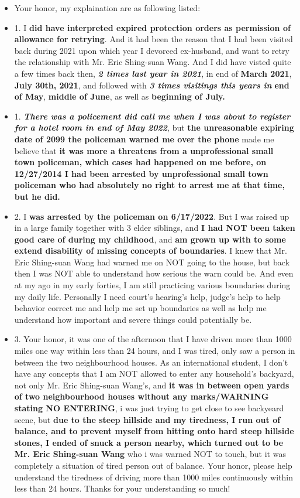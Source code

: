 \documentclass[9pt, b5paper]{article}
\begin{document}
\begin{itemize}
\item Your honor, my explaination are as following listed:
\item 1. I \textbf{did have interpreted expired protection orders as permission of allowance for retrying}. And it had been the reason that I had been visited back during 2021 upon which year I devorced ex-husband, and want to retry the relationship with Mr. Eric Shing-suan Wang. And I did have visted quite a few times back then, \emph{\textbf{2 times last year in 2021}}, in end of \textbf{March 2021}, \textbf{July 30th, 2021}, and followed with \emph{\textbf{3 times visitings this years in}} \textbf{end of May}, \textbf{middle of June}, as well as \textbf{beginning of July.}
\item 1. \emph{\textbf{There was a policement did call me when I was about to register for a hotel room in end of May 2022}}, but \textbf{the unreasonable expiring date of 2099 the policeman warned me over the phone} made me believe that \textbf{it was more a threatens from a unprofessional small town policeman, which cases had happened on me before, on 12/27/2014 I had been arrested by unprofessional small town policeman who had absolutely no right to arrest me at that time, but he did.}
\item 2. I \textbf{was arrested by the policeman on 6/17/2022}. But I was raised up in a large family together with 3 elder siblings, and \textbf{I had NOT been taken good care of during my childhood}, and \textbf{am grown up with to some extend disability of missing concepts of boundaries}. I knew that Mr. Eric Shing-suan Wang had warned me on NOT going to the house, but back then I was NOT able to understand how serious the warn could be. And even at my ago in my early forties, I am still practicing various boundaries during my daily life. Personally I need court's hearing's help, judge's help to help behavior correct me and help me set up boundaries as well as help me understand how important and severe things could potentially be.
\item 3. Your honor, it was one of the afternoon that I have driven more than 1000 miles one way within less than 24 hours, and I was tired, only saw a person in between the two neighbourhood houses. As an international student, I don't have any concepts that I am NOT allowed to enter any household's backyard, not only Mr. Eric Shing-suan Wang's, and \textbf{it was in between open yards of two neighbourhood houses without any marks/WARNING stating NO ENTERING}, i was just trying to get close to see backyeard scene, but \textbf{due to the steep hillside and my tiredness, I run out of balance, and to prevent myself from hitting onto hard steep hillside stones, I ended of snuck a person nearby, which turned out to be Mr. Eric Shing-suan Wang} who i was warned NOT to touch, but it was completely a situation of tired person out of balance. Your honor, please help understand the tiredness of driving more than 1000 miles continuously within less than 24 hours. Thanks for your understanding so much!

\end{itemize}
\end{document}
